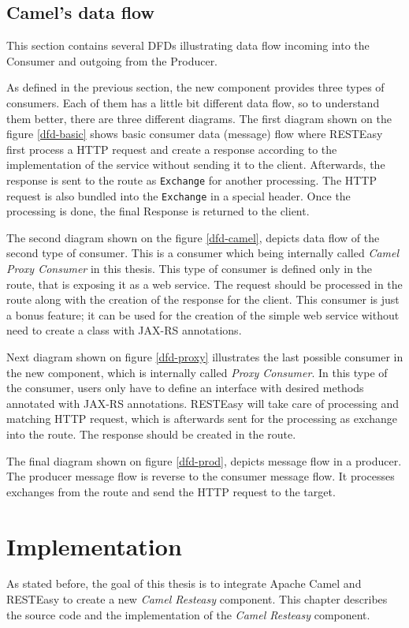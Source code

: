 \documentclass[12pt,final,oneside]{fithesis2}
\begin{document}
\section{Camel's data flow}
This section contains several DFDs illustrating data flow incoming into the Consumer and outgoing from the Producer. 

As defined in the previous section, the new component provides three types of consumers. Each of them has a little bit different data flow, so to understand them better, there are three different diagrams. The first diagram shown on the figure \ref{dfd-basic} shows basic consumer data (message) flow where RESTEasy first process a HTTP request and create a response according to the implementation of the service without sending it to the client. Afterwards, the response is sent to the route as \texttt{Exchange} for another processing. The HTTP request is also bundled into the \texttt{Exchange} in a special header. Once the processing  is done, the final Response is returned to the client. 


The second diagram shown on the figure \ref{dfd-camel}, depicts data flow of the second type of consumer. This is a consumer which being internally called \textit{Camel Proxy Consumer} in this thesis. This type of consumer is defined only in the route, that is exposing it as a web service. The request should be processed in the route along with the creation of the response for the client. This consumer is just a bonus feature; it can be used for the creation of the simple web service without need to create a class with JAX-RS annotations. 


Next diagram shown on figure \ref{dfd-proxy} illustrates the last possible consumer in the new component, which is internally called \textit{Proxy Consumer}. In this type of the consumer, users only have to define an interface with desired methods annotated with JAX-RS annotations. RESTEasy will take care of processing and matching HTTP request, which is afterwards sent for the processing as exchange into the route. The response should be created in the route.  


The final diagram shown on figure \ref{dfd-prod}, depicts message flow in a producer. The producer message flow is reverse to the consumer message flow. It processes exchanges from the route and send the HTTP request to the target. 


\chapter{Implementation}\label{impl}
As stated before, the goal of this thesis is to integrate Apache Camel and RESTEasy to create a new \textit{Camel Resteasy} component. This chapter describes the source code and the implementation of the \textit{Camel Resteasy} component. 
\end{document}

